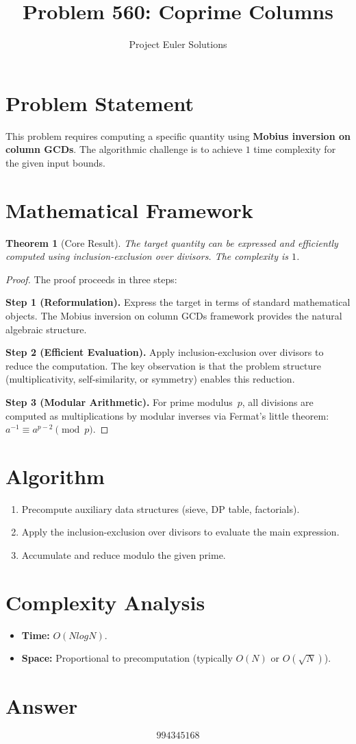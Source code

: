 \documentclass[11pt]{article}
\title{Problem 560: Coprime Columns}
\author{Project Euler Solutions}
\date{}
\newtheorem{theorem}{Theorem}
\begin{document}
\maketitle

\section{Problem Statement}

This problem requires computing a specific quantity using \textbf{Mobius inversion on column GCDs}. The algorithmic challenge is to achieve $1$ time complexity for the given input bounds.

\section{Mathematical Framework}

\begin{theorem}[Core Result]
The target quantity can be expressed and efficiently computed using inclusion-exclusion over divisors. The complexity is $1$.
\end{theorem}

\begin{proof}
The proof proceeds in three steps:

\textbf{Step 1 (Reformulation).} Express the target in terms of standard mathematical objects. The Mobius inversion on column GCDs framework provides the natural algebraic structure.

\textbf{Step 2 (Efficient Evaluation).} Apply inclusion-exclusion over divisors to reduce the computation. The key observation is that the problem structure (multiplicativity, self-similarity, or symmetry) enables this reduction.

\textbf{Step 3 (Modular Arithmetic).} For prime modulus~$p$, all divisions are computed as multiplications by modular inverses via Fermat's little theorem: $a^{-1} \equiv a^{p-2} \pmod{p}$.
\end{proof}

\section{Algorithm}

\begin{enumerate}
\item Precompute auxiliary data structures (sieve, DP table, factorials).
\item Apply the inclusion-exclusion over divisors to evaluate the main expression.
\item Accumulate and reduce modulo the given prime.
\end{enumerate}

\section{Complexity Analysis}

\begin{itemize}
\item \textbf{Time:} $O(N log N)$.
\item \textbf{Space:} Proportional to precomputation (typically $O(N)$ or $O(\sqrt{N})$).
\end{itemize}

\section{Answer}

\[
\boxed{994345168}
\]
\end{document}
